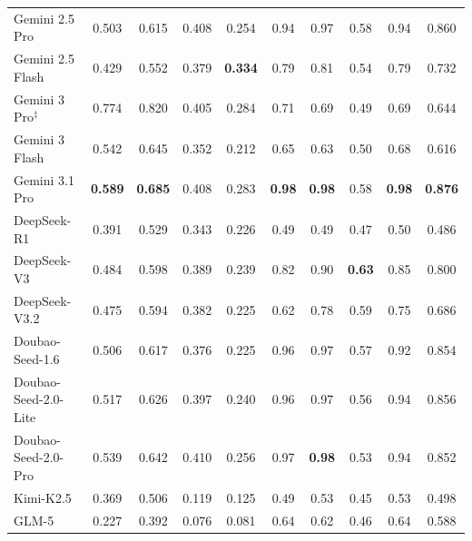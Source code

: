 \documentclass[11pt]{article}
\begin{document}
\begin{table}[!t]
\begin{tabular}{@{}lcc|cc|ccccc@{}}
Gemini 2.5 Pro
& 0.503 & 0.615 & 0.408 & 0.254
& 0.94 & 0.97
& 0.58 & 0.94 & 0.860 \\

Gemini 2.5 Flash
& 0.429 & 0.552 & 0.379
& \cellcolor{sota}\textbf{0.334}
& 0.79 & 0.81 & 0.54 & 0.79 & 0.732 \\

Gemini 3 Pro$^{\ddagger}$
& 0.774 & 0.820 & 0.405 & 0.284
& 0.71 & 0.69 & 0.49 & 0.69 & 0.644 \\

Gemini 3 Flash
& 0.542 & 0.645 & 0.352 & 0.212
& 0.65 & 0.63 & 0.50 & 0.68 & 0.616 \\

Gemini 3.1 Pro
& \cellcolor{sota}\textbf{0.589}
& \cellcolor{sota}\textbf{0.685}
& 0.408 & 0.283
& \cellcolor{sota}\textbf{0.98}
& \cellcolor{sota}\textbf{0.98}
& 0.58
& \cellcolor{sota}\textbf{0.98}
& \cellcolor{sota}\textbf{0.876} \\

\addlinespace[1pt]
\midrule

DeepSeek-R1
& 0.391 & 0.529 & 0.343 & 0.226
& 0.49 & 0.49 & 0.47 & 0.50 & 0.486 \\

DeepSeek-V3
& 0.484 & 0.598 & 0.389 & 0.239
& 0.82 & 0.90
& \cellcolor{sota}\textbf{0.63}
& 0.85 & 0.800 \\

DeepSeek-V3.2
& 0.475 & 0.594 & 0.382 & 0.225
& 0.62 & 0.78 & 0.59 & 0.75 & 0.686 \\

\addlinespace[1pt]
\midrule

Doubao-Seed-1.6
& 0.506 & 0.617 & 0.376 & 0.225
& 0.96 & 0.97 & 0.57 & 0.92 & 0.854 \\

Doubao-Seed-2.0-Lite
& 0.517 & 0.626 & 0.397 & 0.240
& 0.96 & 0.97 & 0.56 & 0.94 & 0.856 \\

Doubao-Seed-2.0-Pro
& 0.539 & 0.642 & 0.410 & 0.256
& 0.97 & \cellcolor{sota}\textbf{0.98}
& 0.53 & 0.94 & 0.852 \\

\addlinespace[1pt]
\midrule

Kimi-K2.5
& 0.369 & 0.506 & 0.119 & 0.125
& 0.49 & 0.53 & 0.45 & 0.53 & 0.498 \\

GLM-5
& 0.227 & 0.392 & 0.076 & 0.081
& 0.64 & 0.62 & 0.46 & 0.64 & 0.588 \\


\end{tabular}
\end{table}
\end{document}
